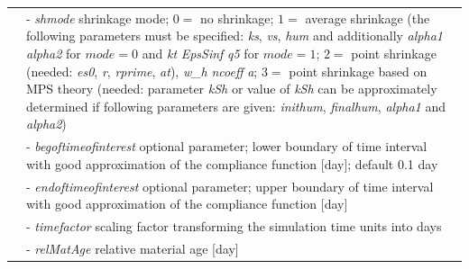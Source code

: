 \documentclass[a4paper]{article}
\newcommand{\param}[1]{{\it #1}}
\begin{document}
\begin{table}[!htb]
\begin{tabular}{|l|p{9cm}|}
&- \param{shmode} shrinkage mode;
$0=$ no shrinkage;
$1=$ average shrinkage (the following parameters must be specified:
\param{ks}, \param{vs}, \param{hum} and additionally  \param{alpha1} \param{alpha2} for $mode = 0$
and \param{kt} \param{EpsSinf} \param{q5} for $mode = 1$;
$2=$ point shrinkage (needed: \param{es0}, \param{r}, \param{rprime},
\param{at}), \param{w\_h} \param{ncoeff} \param{a};
$3=$ point shrinkage based on MPS theory (needed: parameter \param{kSh} or value of \param{kSh} can be approximately determined if following parameters are given: \param{inithum}, \param{finalhum}, \param{alpha1} and \param{alpha2})\\

&- \param{begoftimeofinterest} optional parameter; lower boundary of time interval with good approximation of the compliance function
[day]; default 0.1 day\\
&- \param{endoftimeofinterest} optional parameter; upper boundary of
time interval with good approximation of the compliance function
[day]\\

&- \param{timefactor} scaling factor transforming the simulation time units into days\\
&- \param{relMatAge} relative material age [day]\\
\hline
\end{tabular}
\end{table}
\end{document}
